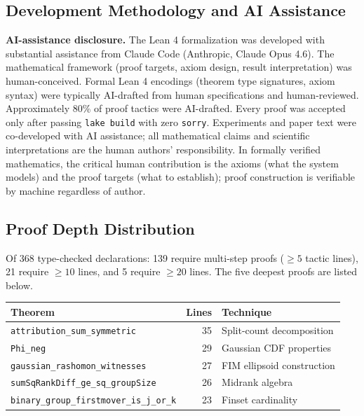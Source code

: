 \documentclass{jmlr}
\begin{document}
\subsection{Development Methodology and AI Assistance}
\label{sec:ai-disclosure-jmlr}

\textbf{AI-assistance disclosure.} The Lean 4 formalization was developed with substantial assistance from Claude Code (Anthropic, Claude Opus 4.6). The mathematical framework (proof targets, axiom design, result interpretation) was human-conceived. Formal Lean 4 encodings (theorem type signatures, axiom syntax) were typically AI-drafted from human specifications and human-reviewed. Approximately 80\% of proof tactics were AI-drafted. Every proof was accepted only after passing \texttt{lake build} with zero \texttt{sorry}. Experiments and paper text were co-developed with AI assistance; all mathematical claims and scientific interpretations are the human authors' responsibility. In formally verified mathematics, the critical human contribution is the axioms (what the system models) and the proof targets (what to establish); proof construction is verifiable by machine regardless of author.

\subsection{Proof Depth Distribution}

Of 368 type-checked declarations: 139 require multi-step proofs (${\geq}5$ tactic lines), 21 require ${\geq}10$ lines, and 5 require ${\geq}20$ lines. The five deepest proofs are listed below.

\begin{center}
\small
\begin{tabular}{@{}lrl@{}}
\toprule
\textbf{Theorem} & \textbf{Lines} & \textbf{Technique} \\
\midrule
\texttt{attribution\_sum\_symmetric} & 35 & Split-count decomposition \\
\texttt{Phi\_neg} & 29 & Gaussian CDF properties \\
\texttt{gaussian\_rashomon\_witnesses} & 27 & FIM ellipsoid construction \\
\texttt{sumSqRankDiff\_ge\_sq\_groupSize} & 26 & Midrank algebra \\
\texttt{binary\_group\_firstmover\_is\_j\_or\_k} & 23 & Finset cardinality \\
\bottomrule
\end{tabular}
\end{center}
\end{document}
